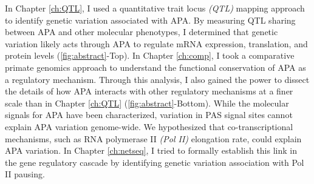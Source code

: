  
 
 In Chapter \ref{ch:QTL}, I used a quantitative trait locus \emph{(QTL)} mapping approach to identify genetic variation associated with APA. By measuring QTL sharing between APA and other molecular phenotypes, I determined that genetic variation likely acts through APA to regulate mRNA expression, translation, and protein levels (\ref{fig:abstract}-Top). In Chapter \ref{ch:comp}, I took a comparative primate genomics approach to understand the functional conservation of APA as a regulatory mechanism. Through this analysis, I also gained the power to dissect the details of how APA interacts with other regulatory mechanisms at a finer scale than in Chapter \ref{ch:QTL} (\ref{fig:abstract}-Bottom). While the molecular signals for APA have been characterized, variation in PAS signal sites cannot explain APA variation genome-wide. We hypothesized that co-transcriptional mechanisms, such as RNA polymerase II \emph{(Pol II)} elongation rate, could explain APA variation. In Chapter \ref{ch:netseq}, I tried to formally establish this link in the gene regulatory cascade by identifying genetic variation association with Pol II pausing.  
 
 
 
